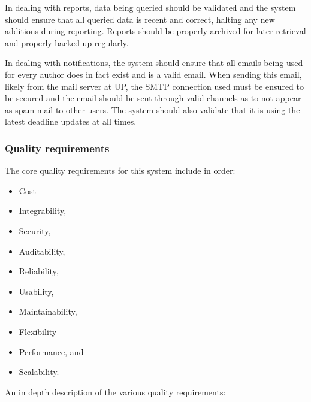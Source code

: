 \documentclass{article}
\begin{document}
		\par In dealing with reports, data being queried should be validated and the system should ensure that all queried data is recent and correct, halting any new additions during reporting. Reports should be properly archived for later retrieval and properly backed up regularly.\\
		
		\par In dealing with notifications, the system should ensure that all emails being used for every author does in fact exist and is a valid email. When sending this email, likely from the mail server at UP, the SMTP connection used must be ensured to be secured and the email should be sent through valid channels as to not appear as spam mail to other users. The system should also validate that it is using the latest deadline updates at all times.
		
		\subsubsection{Quality requirements}\label{subsubsec:quality}
		
		The core quality requirements for this system include in order:
		
		\begin{itemize}
			\item Cost
			\item Integrability,
			\item Security,
			\item Auditability,
			\item Reliability,
			\item Usability,
			\item Maintainability,
			\item Flexibility
			\item Performance, and
			\item Scalability. \newline
		\end{itemize}
		
		An in depth description of the various quality requirements: \newline
		
\end{document}
